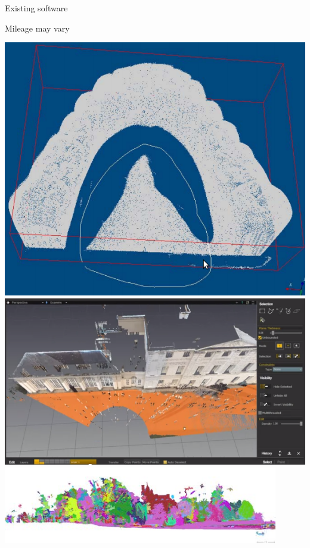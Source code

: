 \documentclass{beamer}
\begin{document}
\begin{frame}{Existing software}

\end{frame}


\begin{frame}{Mileage may vary}

\includegraphics[height=0.4\textheight]{pics/lasso.png}
\includegraphics[height=0.4\textheight]{pics/plane.png}
\\
\includegraphics[width=0.9\textwidth]{pics/3DReshaper_auto_pt_cloud_seg.jpg}

\end{frame}
\end{document}
